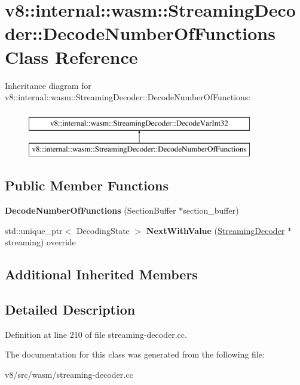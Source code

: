 \hypertarget{classv8_1_1internal_1_1wasm_1_1StreamingDecoder_1_1DecodeNumberOfFunctions}{}\section{v8\+:\+:internal\+:\+:wasm\+:\+:Streaming\+Decoder\+:\+:Decode\+Number\+Of\+Functions Class Reference}
\label{classv8_1_1internal_1_1wasm_1_1StreamingDecoder_1_1DecodeNumberOfFunctions}
Inheritance diagram for v8\+:\+:internal\+:\+:wasm\+:\+:Streaming\+Decoder\+:\+:Decode\+Number\+Of\+Functions\+:\begin{figure}[H]
\begin{center}
\leavevmode
\includegraphics[height=2.000000cm]{classv8_1_1internal_1_1wasm_1_1StreamingDecoder_1_1DecodeNumberOfFunctions}
\end{center}
\end{figure}
\subsection*{Public Member Functions}
\begin{DoxyCompactItemize}
\item 
\mbox{\label{classv8_1_1internal_1_1wasm_1_1StreamingDecoder_1_1DecodeNumberOfFunctions_a01e172089c7fd5ecc5a177c726546137}} 
{\bfseries Decode\+Number\+Of\+Functions} (Section\+Buffer $\ast$section\+\_\+buffer)
\item 
\mbox{\label{classv8_1_1internal_1_1wasm_1_1StreamingDecoder_1_1DecodeNumberOfFunctions_af7b164c236f50dfee1763c5fd3e9bbcf}} 
std\+::unique\+\_\+ptr$<$ Decoding\+State $>$ {\bfseries Next\+With\+Value} (\mbox{\hyperlink{classv8_1_1internal_1_1wasm_1_1StreamingDecoder}{Streaming\+Decoder}} $\ast$streaming) override
\end{DoxyCompactItemize}
\subsection*{Additional Inherited Members}


\subsection{Detailed Description}


Definition at line 210 of file streaming-\/decoder.\+cc.



The documentation for this class was generated from the following file\+:\begin{DoxyCompactItemize}
\item 
v8/src/wasm/streaming-\/decoder.\+cc\end{DoxyCompactItemize}
